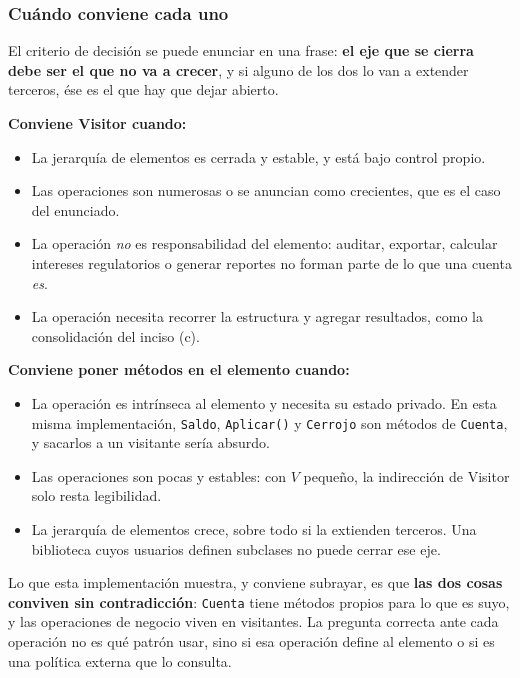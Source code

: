 \subsubsection*{Cuándo conviene cada uno}

El criterio de decisión se puede enunciar en una frase: \textbf{el eje que se cierra debe ser
el que no va a crecer}, y si alguno de los dos lo van a extender terceros, ése es el que hay
que dejar abierto.

\textbf{Conviene Visitor cuando:}

\begin{itemize}[leftmargin=1.2cm]
    \item La jerarquía de elementos es cerrada y estable, y está bajo control propio.
    \item Las operaciones son numerosas o se anuncian como crecientes, que es el caso del
          enunciado.
    \item La operación \emph{no} es responsabilidad del elemento: auditar, exportar, calcular
          intereses regulatorios o generar reportes no forman parte de lo que una cuenta
          \emph{es}.
    \item La operación necesita recorrer la estructura y agregar resultados, como la
          consolidación del inciso (c).
\end{itemize}

\textbf{Conviene poner métodos en el elemento cuando:}

\begin{itemize}[leftmargin=1.2cm]
    \item La operación es intrínseca al elemento y necesita su estado privado. En esta misma
          implementación, \texttt{Saldo}, \texttt{Aplicar()} y \texttt{Cerrojo} son
          métodos de \texttt{Cuenta}, y sacarlos a un visitante sería absurdo.
    \item Las operaciones son pocas y estables: con $V$ pequeño, la indirección de Visitor
          solo resta legibilidad.
    \item La jerarquía de elementos crece, sobre todo si la extienden terceros. Una biblioteca
          cuyos usuarios definen subclases no puede cerrar ese eje.
\end{itemize}

Lo que esta implementación muestra, y conviene subrayar, es que \textbf{las dos cosas conviven
sin contradicción}: \texttt{Cuenta} tiene métodos propios para lo que es suyo, y las
operaciones de negocio viven en visitantes. La pregunta correcta ante cada operación no es qué
patrón usar, sino si esa operación define al elemento o si es una política externa que lo
consulta.

